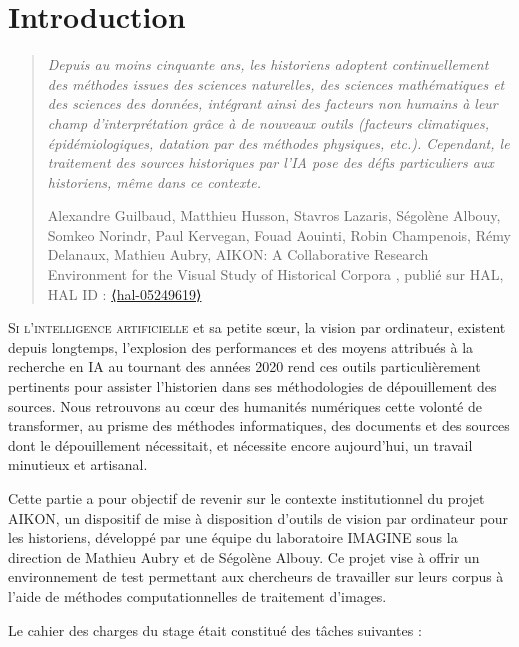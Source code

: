 \section*{Introduction}

\begin{quote}
    \textit{Depuis au moins cinquante ans, les historiens adoptent continuellement des méthodes issues des sciences naturelles, des sciences mathématiques et des sciences des données, intégrant ainsi des facteurs non humains à leur champ d'interprétation
grâce à de nouveaux outils (facteurs climatiques, épidémiologiques, datation par des méthodes physiques, etc.). Cependant, le traitement des sources historiques par l'IA pose des défis particuliers aux historiens, même dans ce contexte.
}

Alexandre Guilbaud, Matthieu Husson, Stavros Lazaris, Ségolène Albouy, Somkeo Norindr, Paul
Kervegan, Fouad Aouinti, Robin Champenois, Rémy Delanaux, Mathieu Aubry, \og AIKON: A Collaborative Research Environment for the Visual Study of Historical Corpora \fg, publié sur HAL, HAL ID : \href{⟨hal-05249619⟩}{⟨hal-05249619⟩}
\end{quote}

\lettrine{S}{i l'intelligence artificielle} et sa petite sœur, la vision par ordinateur, existent depuis longtemps, l'explosion des performances et des moyens attribués à la recherche en IA au tournant des années 2020 rend ces outils particulièrement pertinents pour assister l'historien dans ses méthodologies de dépouillement des sources. Nous retrouvons au cœur des humanités numériques cette volonté de transformer, au prisme des méthodes informatiques, des documents et des sources dont le dépouillement nécessitait, et nécessite encore aujourd'hui, un travail minutieux et artisanal.

Cette partie a pour objectif de revenir sur le contexte institutionnel du projet AIKON, un dispositif de mise à disposition d'outils de vision par ordinateur pour les historiens, développé par une équipe du laboratoire IMAGINE sous la direction de Mathieu Aubry et de Ségolène Albouy. Ce projet vise à offrir un environnement de test permettant aux chercheurs de travailler sur leurs corpus à l'aide de méthodes computationnelles de traitement d'images.

Le cahier des charges du stage était constitué des tâches suivantes :

